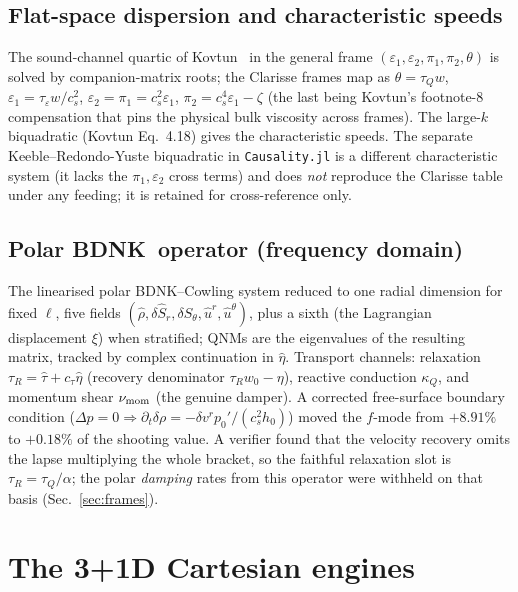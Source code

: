 \documentclass[aps,prd,preprint,amsmath,amssymb,nofootinbib,longbibliography]{revtex4-2}
\newcommand{\cs}{c_s}
\newcommand{\BDNK}{BDNK}
\begin{document}
\subsection{Flat-space dispersion and characteristic speeds}
The sound-channel quartic of Kovtun~\cite{Kovtun2019} in the general frame
$(\varepsilon_1,\varepsilon_2,\pi_1,\pi_2,\theta)$ is solved by companion-matrix roots; the
Clarisse frames map as $\theta = \tau_Qw$, $\varepsilon_1 = \tau_\varepsilon w/\cs^2$,
$\varepsilon_2 = \pi_1 = \cs^2\varepsilon_1$, $\pi_2 = \cs^4\varepsilon_1 - \zeta$ (the last being
Kovtun's footnote-8 compensation that pins the physical bulk viscosity across frames). The
large-$k$ biquadratic (Kovtun Eq.~4.18) gives the characteristic speeds. The separate
Keeble--Redondo-Yuste biquadratic in \texttt{Causality.jl} is a different characteristic system
(it lacks the $\pi_1,\varepsilon_2$ cross terms) and does \emph{not} reproduce the Clarisse table
under any feeding; it is retained for cross-reference only.

\subsection{Polar \BDNK\ operator (frequency domain)}
The linearised polar \BDNK--Cowling system reduced to one radial dimension for fixed $\ell$,
five fields $(\hat\rho, \delta\hat S_r, \delta\hat S_\theta, \hat u^r, \hat u^\theta)$, plus a sixth
(the Lagrangian displacement $\xi$) when stratified; QNMs are the eigenvalues of the resulting
matrix, tracked by complex continuation in $\hat\eta$. Transport channels: relaxation
$\tau_R = \hat\tau + c_\tau\hat\eta$ (recovery denominator $\tau_Rw_0-\eta$), reactive conduction
$\kappa_Q$, and momentum shear $\nu_{\rm mom}$ (the genuine damper). A corrected free-surface
boundary condition ($\Delta p = 0 \Rightarrow \partial_t\delta\rho = -\delta v^r p_0'/(\cs^2h_0)$)
moved the $f$-mode from $+8.91\%$ to $+0.18\%$ of the shooting value. A verifier found that the
velocity recovery omits the lapse multiplying the whole bracket, so the faithful relaxation slot
is $\tau_R = \tau_Q/\alpha$; the polar \emph{damping} rates from this operator were withheld on
that basis (Sec.~\ref{sec:frames}).

\section{The 3+1D Cartesian engines}
\label{sec:engines}
\end{document}
